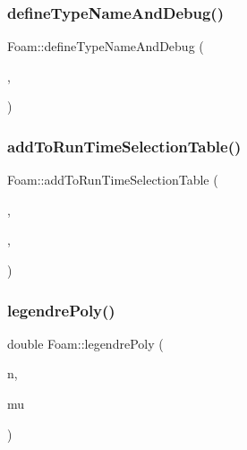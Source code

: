 \mbox{\label{namespaceFoam_a884021718558f21a78a9ac78d5218064}} 
\subsubsection{\texorpdfstring{define\+Type\+Name\+And\+Debug()}{defineTypeNameAndDebug()}\hspace{0.1cm}{\footnotesize\ttfamily [5/50]}}
{\footnotesize\ttfamily Foam\+::define\+Type\+Name\+And\+Debug (\begin{DoxyParamCaption}\item[{\hyperlink{classFoam_1_1pointKineticNeutronics}{point\+Kinetic\+Neutronics}}]{,  }\item[{0}]{ }\end{DoxyParamCaption})}

\mbox{\label{namespaceFoam_ac359828b716af503c067985cb12130fe}} 
\subsubsection{\texorpdfstring{add\+To\+Run\+Time\+Selection\+Table()}{addToRunTimeSelectionTable()}\hspace{0.1cm}{\footnotesize\ttfamily [3/6]}}
{\footnotesize\ttfamily Foam\+::add\+To\+Run\+Time\+Selection\+Table (\begin{DoxyParamCaption}\item[{\hyperlink{classFoam_1_1neutronics}{neutronics}}]{,  }\item[{\hyperlink{classFoam_1_1pointKineticNeutronics}{point\+Kinetic\+Neutronics}}]{,  }\item[{dictionary}]{ }\end{DoxyParamCaption})}

\mbox{\label{namespaceFoam_a09d3256445918e0d39ba72953ec62dfe}} 
\subsubsection{\texorpdfstring{legendre\+Poly()}{legendrePoly()}}
{\footnotesize\ttfamily double Foam\+::legendre\+Poly (\begin{DoxyParamCaption}\item[{int}]{n,  }\item[{double}]{mu }\end{DoxyParamCaption})}




